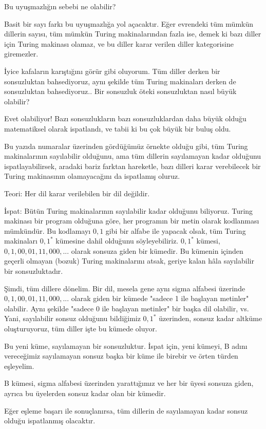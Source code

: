 \documentclass[12pt,fleqn]{article}\usepackage{../../common}
\begin{document}
Bu uyuşmazlığın sebebi ne olabilir? 

Basit bir sayı farkı bu uyuşmazlığa yol açacaktır. Eğer evrendeki tüm
mümkün dillerin sayısı, tüm mümkün Turing makinalarından fazla ise, demek
ki bazı diller için Turing makinası olamaz, ve bu diller karar verilen
diller kategorisine giremezler.

İyice kafaların karıştığını görür gibi oluyorum. Tüm diller derken bir
sonsuzluktan bahsediyoruz, aynı şekilde tüm Turing makinaları derken de
sonsuzluktan bahsediyoruz.. Bir sonsuzluk öteki sonsuzluktan nasıl büyük
olabilir?

Evet olabiliyor! Bazı sonsuzlukların bazı sonsuzluklardan daha büyük olduğu
matematiksel olarak ispatlandı, ve tabii ki bu çok büyük bir buluş oldu.

Bu yazıda numaralar üzerinden gördüğümüz örnekte olduğu gibi, tüm Turing
makinalarının sayılabilir olduğunu, ama tüm dillerin sayılamayan kadar
olduğunu ispatlayabilirsek, aradaki bariz farktan hareketle, bazı dilleri
karar verebilecek bir Turing makinasının olamayacağını da ispatlamış
oluruz.

Teori: Her dil karar verilebilen bir dil değildir.

İspat: Bütün Turing makinalarının sayılabilir kadar olduğunu biliyoruz. Turing
makinası bir program olduğuna göre, her programın bir metin olarak kodlanması
mümkündür. Bu kodlamayı ${0,1}$ gibi bir alfabe ile yapacak olsak, tüm Turing
makinaları ${0,1}^\ast$ kümesine dahil olduğunu söyleyebiliriz. ${0,1}^\ast$
kümesi, ${0,1,00,01,11,000,...}$ olarak sonsuza giden bir kümedir. Bu kümenin
içinden geçerli olmayan (bozuk) Turing makinalarını atsak, geriye kalan hâla
sayılabilir bir sonsuzluktadır.

Şimdi, tüm dillere dönelim. Bir dil, mesela gene aynı sigma alfabesi üzerinde
${0,1,00,01,11,000,...}$ olarak giden bir kümede "sadece 1 ile başlayan
metinler" olabilir. Aynı şekilde "sadece 0 ile başlayan metinler" bir başka dil
olabilir, vs. Yani, sayılabilir sonsuz olduğunu bildiğimiz ${0,1}^\ast$
üzerinden, sonsuz kadar altküme oluşturuyoruz, tüm diller işte bu kümede oluyor.

Bu yeni küme, sayılamayan bir sonsuzluktur. İspat için, yeni kümeyi, B
adını vereceğimiz sayılamayan sonsuz başka bir küme ile birebir ve örten
türden eşleyelim.

B kümesi, sigma alfabesi üzerinden yarattığımız ve her bir üyesi sonsuza
giden, ayrıca bu üyelerden sonsuz kadar olan bir kümedir.

Eğer eşleme başarı ile sonuçlanırsa, tüm dillerin de sayılamayan kadar
sonsuz olduğu ispatlanmış olacaktır.
\end{document}
